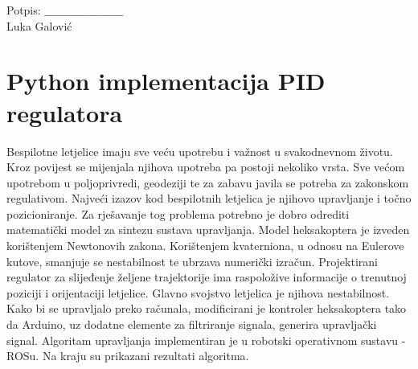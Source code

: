 \documentclass[times, utf8, diplomski]{fer}
\begin{document}
\vfill
\hspace*{0pt}\hfill Potpis:  $\_\_\_\_\_\_\_\_\_\_\_\_\_\_\_\_\_\_\_\_\_$\\
\hspace*{5pt}\hfill Luka Galović




\appendix
\chapter{Python implementacija PID regulatora}



\begin{sazetak}
Bespilotne letjelice imaju sve veću upotrebu i važnost u svakodnevnom životu. Kroz povijest se mijenjala njihova upotreba pa postoji nekoliko vrsta. Sve većom upotrebom u poljoprivredi, geodeziji te za zabavu javila se potreba za zakonskom regulativom. Najveći izazov kod bespilotnih letjelica je njihovo upravljanje i točno pozicioniranje. Za rješavanje tog problema potrebno je dobro odrediti matematički model za sintezu sustava upravljanja. Model heksakoptera je izveden korištenjem Newtonovih zakona. Korištenjem kvaterniona, u odnosu na Eulerove kutove, smanjuje se nestabilnost te ubrzava numerički izračun. Projektirani regulator za slijeđenje željene trajektorije ima raspoložive informacije o trenutnoj poziciji i orijentaciji letjelice. Glavno svojstvo letjelica je njihova nestabilnost. Kako bi se upravljalo preko računala, modificirani je kontroler heksakoptera tako da Arduino, uz dodatne elemente za filtriranje signala, generira upravljački signal. Algoritam upravljanja implementiran je u robotski operativnom sustavu - ROSu. Na kraju su prikazani rezultati algoritma. 

\end{sazetak}
\newpage
\end{document}
